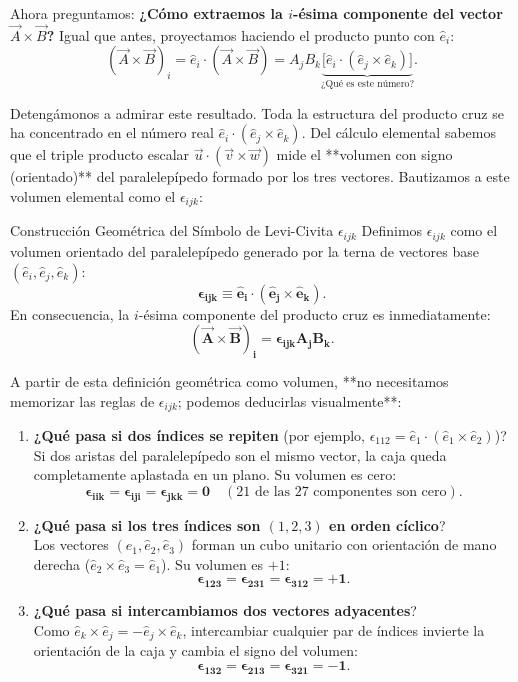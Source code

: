 \documentclass[11pt,letterpaper]{article}
\begin{document}
Ahora preguntamos: \textbf{¿Cómo extraemos la $i$-ésima componente del vector $\vec{A} \times \vec{B}$?} Igual que antes, proyectamos haciendo el producto punto con $\hat{e}_i$:
\[
(\vec{A} \times \vec{B})_i = \hat{e}_i \cdot (\vec{A} \times \vec{B}) = A_j B_k \underbrace{\big[\hat{e}_i \cdot (\hat{e}_j \times \hat{e}_k)\big]}_{\text{¿Qué es este número?}}.
\]

Detengámonos a admirar este resultado. Toda la estructura del producto cruz se ha concentrado en el número real $\hat{e}_i \cdot (\hat{e}_j \times \hat{e}_k)$. Del cálculo elemental sabemos que el triple producto escalar $\vec{u} \cdot (\vec{v} \times \vec{w})$ mide el **volumen con signo (orientado)** del paralelepípedo formado por los tres vectores. Bautizamos a este volumen elemental como el  $\epsilon_{ijk}$:

\begin{theorembox}{Construcción Geométrica del Símbolo de Levi-Civita $\epsilon_{ijk}$}
Definimos $\epsilon_{ijk}$ como el volumen orientado del paralelepípedo generado por la terna de vectores base $(\hat{e}_i, \hat{e}_j, \hat{e}_k)$:
\[
\mathbf{\epsilon_{ijk} \equiv \hat{e}_i \cdot (\hat{e}_j \times \hat{e}_k)}.
\]
En consecuencia, la $i$-ésima componente del producto cruz es inmediatamente:
\[
\mathbf{(\vec{A} \times \vec{B})_i = \epsilon_{ijk} A_j B_k}.
\]
\end{theorembox}

A partir de esta definición geométrica como volumen, **no necesitamos memorizar las reglas de $\epsilon_{ijk}$; podemos deducirlas visualmente**:

\begin{enumerate}
    \item \textbf{¿Qué pasa si dos índices se repiten} (por ejemplo, $\epsilon_{112} = \hat{e}_1 \cdot (\hat{e}_1 \times \hat{e}_2)$)?\\
    Si dos aristas del paralelepípedo son el mismo vector, la caja queda completamente aplastada en un plano. Su volumen es cero:
    \[
    \mathbf{\epsilon_{iik} = \epsilon_{iji} = \epsilon_{jkk} = 0} \quad (\text{21 de las 27 componentes son cero}).
    \]
    \item \textbf{¿Qué pasa si los tres índices son $(1, 2, 3)$ en orden cíclico}?\\
    Los vectores $(\hat{e}_1, \hat{e}_2, \hat{e}_3)$ forman un cubo unitario con orientación de mano derecha ($\hat{e}_2 \times \hat{e}_3 = \hat{e}_1$). Su volumen es $+1$:
    \[
    \mathbf{\epsilon_{123} = \epsilon_{231} = \epsilon_{312} = +1}.
    \]
    \item \textbf{¿Qué pasa si intercambiamos dos vectores adyacentes}?\\
    Como $\hat{e}_k \times \hat{e}_j = -\hat{e}_j \times \hat{e}_k$, intercambiar cualquier par de índices invierte la orientación de la caja y cambia el signo del volumen:
    \[
    \mathbf{\epsilon_{132} = \epsilon_{213} = \epsilon_{321} = -1}.
    \]
\end{enumerate}
\end{document}
